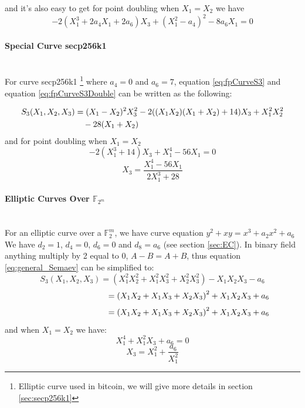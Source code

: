 and it's also easy to get for point doubling when $X_1=X_2$ we have \\
\begin{equation} \label{eq:fpCurveS3Double}
-2\left( X_1^3 + 2a_4X_1+2a_6\right)X_3+\left( X_1^2 - a_4 \right)^2 - 8a_6X_1 = 0
\end{equation}
\paragraph{Special Curve secp256k1} \mbox{ } \\
For curve secp256k1 \footnote{Elliptic curve used in bitcoin, we will give more details in section \ref{sec:secp256k1} } where $a_4 = 0$ and $a_6 = 7$, equation \ref{eq:fpCurveS3} and equation \ref{eq:fpCurveS3Double} can be written as the following:

\begin{equation} \label{eq:secp256CurveS3}
\begin{split}
S_3( X_1,X_2,X_3) &= ( X_1-X_2)^2X_3^2-2( ( X_1X_2)(X_1+X_2 ) + 14) X_3 + X_1^2X_2^2 \\
&\text{\space \space \space } - 28(X_1+X_2)
\end{split}
\end{equation}
and for point doubling when $X_1=X_2$
$$ -2\left( X_1^3 + 14\right)X_3+ X_1^4 - 56 X_1 = 0 $$
$$ X_3 = \frac{X_1^4-56X_1}{2X_1^3+28}$$

\paragraph{Elliptic Curves Over $\mathbb{F}_{2^m}$} \mbox{} \\
For an elliptic curve over a $\mathbb{F}_2^m$, we have curve equation $y^2+xy=x^3+a_2x^2+a_6$
We have $d_2=1$, $d_4=0$, $d_6=0$ and $d_8=a_6$ (see section \ref{sec:EC}). In binary field anything multiply by 2 equal to 0, $A-B=A+B$, thus equation \ref{eq:general_Semaev} can be simplified to:
$$S_3(X_1,X_2,X_3) = (X_1^2X_2^2+X_1^2X_3^2+X_2^2X_3^2)-X_1X_2X_3-a_6$$
$$\text{\space\space\space\space\space\space\space\space\space\space\space\space\space\space\space\space\space\space\space\space\space\space\space\space\space\space} = \left( X_1X_2+X_1X_3+X_2X_3 \right) ^2 + X_1X_2X_3+a_6$$
$$\text{\space\space\space\space\space\space\space\space\space\space\space\space\space\space\space\space\space\space\space\space\space\space\space\space\space\space} = \left( X_1X_2+X_1X_3+X_2X_3 \right) ^2 + X_1X_2X_3+a_6$$
and when $X_1=X_2$ we have:
$$X_1^4+X_1^2X_3+a_6=0$$
$$X_3=X_1^2+\frac{a_6}{X_1^2}$$

